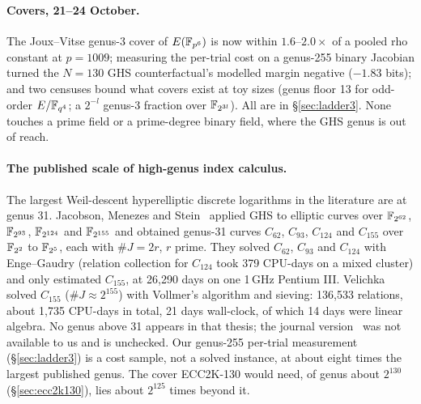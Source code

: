 \paragraph{Covers, 21--24 October.} The Joux--Vitse genus-3 cover of
$E(\mathbb{F}_{p^6})$ is now within $1.6$--$2.0\times$ of a pooled rho constant at
$p=1009$; measuring the per-trial cost on a genus-255 binary Jacobian
turned the $N=130$ GHS counterfactual's modelled margin negative ($-1.83$
bits); and two censuses bound what covers exist at toy sizes (genus floor 13
for odd-order $E/\mathbb{F}_{q^4}$; a $2^{-l}$ genus-3 fraction over
$\mathbb{F}_{2^{3l}}$). All are in \S\ref{sec:ladder3}. None touches a prime field
or a prime-degree binary field, where the GHS genus is out of reach.

\paragraph{The published scale of high-genus index calculus.} The largest
Weil-descent hyperelliptic discrete logarithms in the literature are at
genus 31. Jacobson, Menezes and Stein~\cite{jms2001} applied GHS to elliptic
curves over $\mathbb{F}_{2^{62}}$, $\mathbb{F}_{2^{93}}$, $\mathbb{F}_{2^{124}}$ and
$\mathbb{F}_{2^{155}}$ and obtained genus-31 curves $C_{62}$, $C_{93}$, $C_{124}$
and $C_{155}$ over $\mathbb{F}_{2^2}$ to $\mathbb{F}_{2^5}$, each with $\#J=2r$, $r$
prime. They solved $C_{62}$, $C_{93}$ and $C_{124}$ with Enge--Gaudry
(relation collection for $C_{124}$ took 379 CPU-days on a mixed cluster) and
only estimated $C_{155}$, at 26{,}290 days on one 1\,GHz Pentium III.
Velichka~\cite{velichka2008} solved $C_{155}$ ($\#J\approx2^{155}$) with
Vollmer's algorithm and sieving: 136{,}533 relations, about 1{,}735 CPU-days
in total, 21 days wall-clock, of which 14 days were linear algebra. No genus
above 31 appears in that thesis; the journal version~\cite{vjs2014} was not
available to us and is unchecked. Our genus-255 per-trial measurement
(\S\ref{sec:ladder3}) is a cost sample, not a solved instance, at about
eight times the largest published genus. The cover ECC2K-130 would need, of
genus about $2^{130}$ (\S\ref{sec:ecc2k130}), lies about $2^{125}$ times
beyond it.

